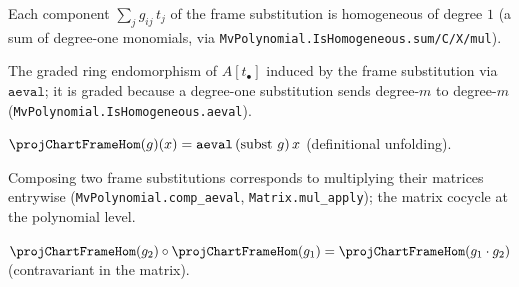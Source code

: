 \begin{lemma}

  \label{lem:projchart-frame-subst-homogeneous}
  Each component $\sum_j g_{ij}\,t_j$ of the frame substitution is homogeneous of
  degree $1$ (a sum of degree-one monomials, via
  \texttt{MvPolynomial.IsHomogeneous.sum/C/X/mul}).
\end{lemma}

\begin{definition}

  \label{def:projchart-frame-hom}
  The graded ring endomorphism of $A[t_\bullet]$ induced by the frame substitution
  via $\mathtt{aeval}$; it is graded because a degree-one substitution sends
  degree-$m$ to degree-$m$ (\texttt{MvPolynomial.IsHomogeneous.aeval}).
\end{definition}

\begin{lemma}

  \label{lem:projchart-frame-hom-apply}
  $\projChartFrameHom(g)(x) = \mathtt{aeval}\,(\text{subst }g)\,x$ (definitional
  unfolding).
\end{lemma}

\begin{lemma}

  \label{lem:projchart-frame-subst-comp}
  Composing two frame substitutions corresponds to multiplying their matrices
  entrywise (\texttt{MvPolynomial.comp\_aeval}, \texttt{Matrix.mul\_apply}); the
  matrix cocycle at the polynomial level.
\end{lemma}

\begin{lemma}

  \label{lem:projchart-frame-hom-comp}
  $\projChartFrameHom(g_2)\circ\projChartFrameHom(g_1) =
  \projChartFrameHom(g_1\cdot g_2)$ (contravariant in the matrix).
\end{lemma}

